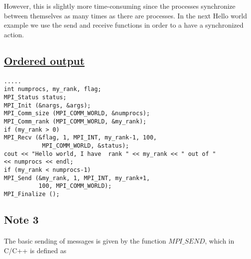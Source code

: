 \noindent
However, this is slightly more time-consuming since the processes synchronize between themselves as many times as there
are processes.  In the next Hello world example we use the send and receive functions in order to a have a synchronized
action.



\subsection*{\href{{https://github.com/CompPhysics/ComputationalPhysics2/blob/gh-pages/doc/Programs/LecturePrograms/programs/MPI/chapter07/program4.cpp}}{Ordered output}}

\paragraph{}

















\begin{Verbatim}[numbers=none,fontsize=\fontsize{9pt}{9pt},baselinestretch=0.95]
.....
int numprocs, my_rank, flag;
MPI_Status status;
MPI_Init (&nargs, &args);
MPI_Comm_size (MPI_COMM_WORLD, &numprocs);
MPI_Comm_rank (MPI_COMM_WORLD, &my_rank);
if (my_rank > 0)
MPI_Recv (&flag, 1, MPI_INT, my_rank-1, 100, 
           MPI_COMM_WORLD, &status);
cout << "Hello world, I have  rank " << my_rank << " out of " 
<< numprocs << endl;
if (my_rank < numprocs-1)
MPI_Send (&my_rank, 1, MPI_INT, my_rank+1, 
          100, MPI_COMM_WORLD);
MPI_Finalize ();

\end{Verbatim}



\subsection*{Note 3}

\paragraph{}

The basic sending of messages is given by the function $MPI\_SEND$, which in C/C++
is defined as 




